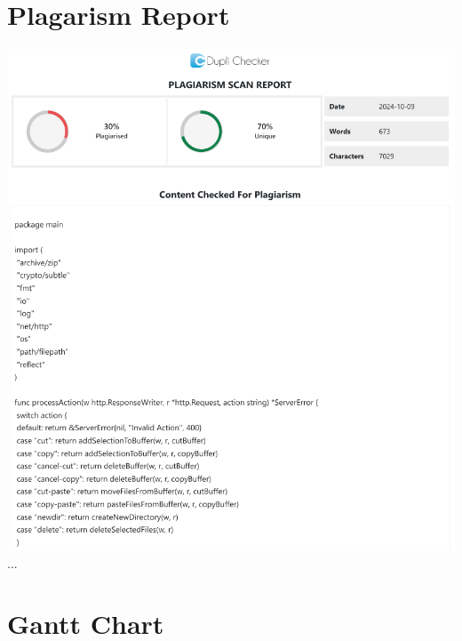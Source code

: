\documentclass[12pt]{article}
\begin{document}
\section{Plagarism Report}
\vspace{2cm}
\includegraphics[width=\linewidth]{dupli-checker} \\
...


\section{Gantt Chart}
\end{document}
